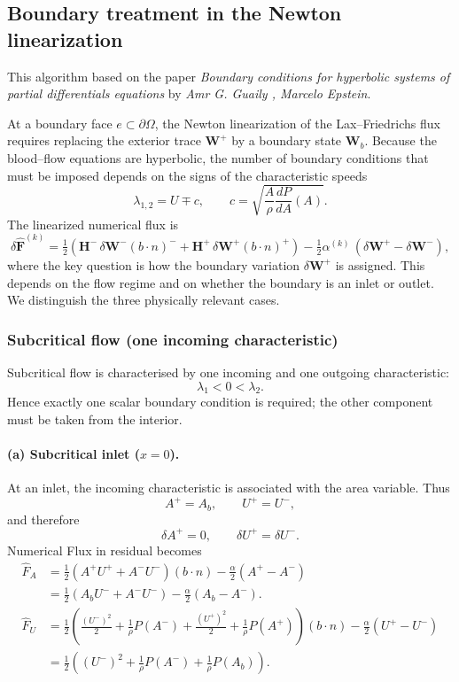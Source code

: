 \documentclass[11pt]{article}
\begin{document}
\subsection{Boundary treatment in the Newton linearization}
This algorithm based on the paper \textit{Boundary conditions for hyperbolic systems of partial differentials equations} by \textit{Amr G. Guaily , Marcelo Epstein}.

At a boundary face $e \subset \partial\Omega$, the Newton linearization of the
Lax–Friedrichs flux requires replacing the exterior trace
$\mathbf{W}^+$ by a boundary state $\mathbf{W}_b$.
Because the blood–flow equations are hyperbolic, the number of boundary
conditions that must be imposed depends on the signs of the characteristic
speeds
\[
  \lambda_{1,2} = U \mp c , \qquad
  c = \sqrt{\frac{A}{\rho}\frac{dP}{dA}(A)} .
\]
The linearized numerical flux is
\[
\delta\widehat{\mathbf{F}}^{(k)}
=
\tfrac12\!\left(
\mathbf{H}^-\,\delta\mathbf{W}^- (b \cdot n)^{-} +
\mathbf{H}^+\,\delta\mathbf{W}^+ (b \cdot n)^{+}
\right)
-\tfrac12\alpha^{(k)}\,
  (\delta\mathbf{W}^+ - \delta\mathbf{W}^-),
\]
where the key question is how the boundary variation $\delta\mathbf{W}^+$ is
assigned.  
This depends on the flow regime and on whether the boundary is an inlet or
outlet.  We distinguish the three physically relevant cases.

\subsubsection{Subcritical flow (one incoming characteristic)}

Subcritical flow is characterised by one incoming and one outgoing
characteristic:
\[
  \lambda_1 < 0 < \lambda_2 .
\]
Hence exactly one scalar boundary condition is required; the other component
must be taken from the interior.

\paragraph{(a) Subcritical inlet ($x=0$).}
At an inlet, the incoming characteristic is associated with the area variable.
Thus
\[
  A^+ = A_b, \qquad U^+ = U^-,
\]
and therefore
\[
  \delta A^+ = 0, \qquad
  \delta U^+ = \delta U^- .
\]
Numerical Flux in residual becomes 
\begin{align*}
 \widehat{F}_A &= \tfrac{1}{2} (A^{+} U^{+}  + A^{-}U^{-})(b \cdot n) - \tfrac{\alpha}{2}(A^{+} - A^{-})\\
 & = \frac{1}{2}(A_b U^{-} + A^{-}U^{-}) - \tfrac{\alpha}{2}(A_b -A^{-}).\\
\widehat{F}_U &= \tfrac{1}{2} \left(\frac{(U^-)^2}{2} + \frac{1}{\rho}P(A^-) + \frac{(U^+)^2}{2} + \frac{1}{\rho}P(A^+)\right)(b \cdot n) -\tfrac{\alpha}{2}(U^+ - U^-) \\
& = \frac{1}{2}\left( (U^{-})^2 +\frac{1}{\rho} P(A^-)  + \frac{1}{\rho} P(A_b)   \right).
\end{align*}
\end{document}
